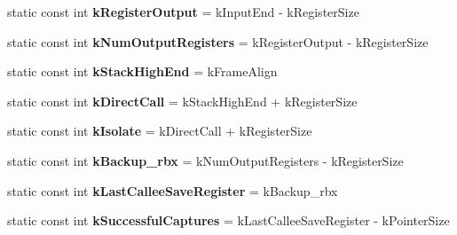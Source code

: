 \begin{DoxyCompactItemize}
\item 
static const int {\bfseries k\+Register\+Output} = k\+Input\+End -\/ k\+Register\+Size\hypertarget{classv8_1_1internal_1_1_reg_exp_macro_assembler_x64_ae663e86fce493f6ab9aae51ec8198008}{}\label{classv8_1_1internal_1_1_reg_exp_macro_assembler_x64_ae663e86fce493f6ab9aae51ec8198008}

\item 
static const int {\bfseries k\+Num\+Output\+Registers} = k\+Register\+Output -\/ k\+Register\+Size\hypertarget{classv8_1_1internal_1_1_reg_exp_macro_assembler_x64_a96d1cc41551a5483de8b2e2c646863dd}{}\label{classv8_1_1internal_1_1_reg_exp_macro_assembler_x64_a96d1cc41551a5483de8b2e2c646863dd}

\item 
static const int {\bfseries k\+Stack\+High\+End} = k\+Frame\+Align\hypertarget{classv8_1_1internal_1_1_reg_exp_macro_assembler_x64_a4a931eb7c3ac17158f05457850ce25bf}{}\label{classv8_1_1internal_1_1_reg_exp_macro_assembler_x64_a4a931eb7c3ac17158f05457850ce25bf}

\item 
static const int {\bfseries k\+Direct\+Call} = k\+Stack\+High\+End + k\+Register\+Size\hypertarget{classv8_1_1internal_1_1_reg_exp_macro_assembler_x64_aa01aeec26e83d92b61137e9c604f3808}{}\label{classv8_1_1internal_1_1_reg_exp_macro_assembler_x64_aa01aeec26e83d92b61137e9c604f3808}

\item 
static const int {\bfseries k\+Isolate} = k\+Direct\+Call + k\+Register\+Size\hypertarget{classv8_1_1internal_1_1_reg_exp_macro_assembler_x64_a5c0a67009dad7759e2954fb06d0d7bed}{}\label{classv8_1_1internal_1_1_reg_exp_macro_assembler_x64_a5c0a67009dad7759e2954fb06d0d7bed}

\item 
static const int {\bfseries k\+Backup\+\_\+rbx} = k\+Num\+Output\+Registers -\/ k\+Register\+Size\hypertarget{classv8_1_1internal_1_1_reg_exp_macro_assembler_x64_a82ec1e13de233c176835e40f7f4f331b}{}\label{classv8_1_1internal_1_1_reg_exp_macro_assembler_x64_a82ec1e13de233c176835e40f7f4f331b}

\item 
static const int {\bfseries k\+Last\+Callee\+Save\+Register} = k\+Backup\+\_\+rbx\hypertarget{classv8_1_1internal_1_1_reg_exp_macro_assembler_x64_a676d51f475cefb9d571612084f3ac183}{}\label{classv8_1_1internal_1_1_reg_exp_macro_assembler_x64_a676d51f475cefb9d571612084f3ac183}

\item 
static const int {\bfseries k\+Successful\+Captures} = k\+Last\+Callee\+Save\+Register -\/ k\+Pointer\+Size\hypertarget{classv8_1_1internal_1_1_reg_exp_macro_assembler_x64_afe4240db314a4c2387fa10f983420852}{}\label{classv8_1_1internal_1_1_reg_exp_macro_assembler_x64_afe4240db314a4c2387fa10f983420852}


\end{DoxyCompactItemize}
